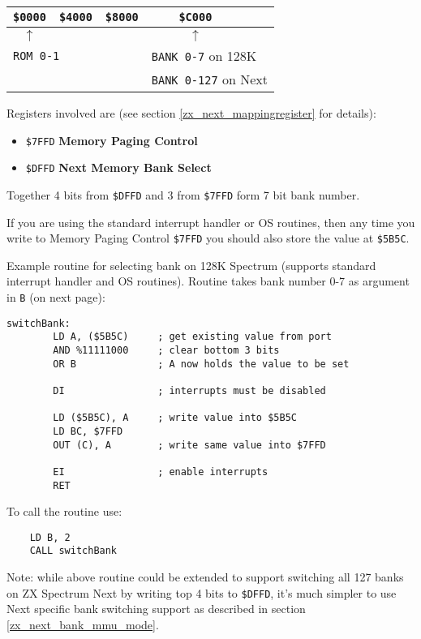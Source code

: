 \documentclass[12pt,twoside,openright,a4paper]{book}
\begin{document}
\begin{tabular}{ccccl}
	{\tt \$0000} & {\tt \$4000} & {\tt \$8000} & {\tt \$C000} & \\
	\hline
	$\uparrow$ & & & $\uparrow$ & \\
	\multicolumn{2}{l}{\tt ROM 0-1} & & \multicolumn{2}{l}{{\tt BANK 0-7} on 128K} \\
	& & & \multicolumn{2}{l}{{\tt BANK 0-127} on Next} \\
\end{tabular}

Registers involved are (see section \ref{zx_next_mappingregister} for details):

\begin{itemize}[topsep=1pt,itemsep=1pt]
	\item {\tt \$7FFD} \textbf{Memory Paging Control}
	\item {\tt \$DFFD} \textbf{Next Memory Bank Select}
\end{itemize}

Together 4 bits from {\tt \$DFFD} and 3 from {\tt \$7FFD} form 7 bit bank number.

If you are using the standard interrupt handler or OS routines, then any time you write to Memory Paging Control {\tt \$7FFD} you should also store the value at {\tt \$5B5C}.

Example routine for selecting bank on 128K Spectrum (supports standard interrupt handler and OS routines). Routine takes bank number 0-7 as argument in {\tt B} (on next page):

\begin{Verbatim}[gobble=1]
	switchBank:
		LD A, ($5B5C)     ; get existing value from port
		AND %11111000     ; clear bottom 3 bits
		OR B              ; A now holds the value to be set

		DI                ; interrupts must be disabled

		LD ($5B5C), A     ; write value into $5B5C
		LD BC, $7FFD
		OUT (C), A        ; write same value into $7FFD

		EI                ; enable interrupts
		RET
\end{Verbatim}

To call the routine use:

\begin{Verbatim}
	LD B, 2
	CALL switchBank
\end{Verbatim}

Note: while above routine could be extended to support switching all 127 banks on ZX Spectrum Next by writing top 4 bits to {\tt \$DFFD}, it's much simpler to use Next specific bank switching support as described in section \ref{zx_next_bank_mmu_mode}.
\end{document}
